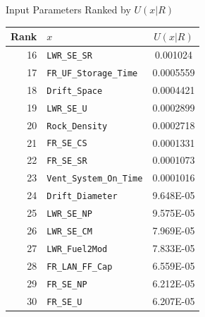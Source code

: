 \documentclass[pdf, autumn, slideColor, nocolorBG]{prosper}
\begin{document}
\begin{slide}{Input Parameters Ranked by $U(x|R)$}
\begin{center}
\tiny
\begin{tabular}{|r|l|c|}
\hline
\textbf{Rank} & \textbf{$x$} & \textbf{$U(x|R)$}\\
\hline
16&\texttt{LWR\_SE\_SR}&0.001024\\
\hline
17&\texttt{FR\_UF\_Storage\_Time}&0.0005559\\
\hline
18&\texttt{Drift\_Space}&0.0004421\\
\hline
19&\texttt{LWR\_SE\_U}&0.0002899\\
\hline
20&\texttt{Rock\_Density}&0.0002718\\
\hline
21&\texttt{FR\_SE\_CS}&0.0001331\\
\hline
22&\texttt{FR\_SE\_SR}&0.0001073\\
\hline
23&\texttt{Vent\_System\_On\_Time}&0.0001016\\
\hline
24&\texttt{Drift\_Diameter}&9.648E-05\\
\hline
25&\texttt{LWR\_SE\_NP}&9.575E-05\\
\hline
26&\texttt{LWR\_SE\_CM}&7.969E-05\\
\hline
27&\texttt{LWR\_Fuel2Mod}&7.833E-05\\
\hline
28&\texttt{FR\_LAN\_FF\_Cap}&6.559E-05\\
\hline
29&\texttt{FR\_SE\_NP}&6.212E-05\\
\hline
30&\texttt{FR\_SE\_U}&6.207E-05\\
\hline
\end{tabular}
\end{center}
\end{slide}
\end{document}
